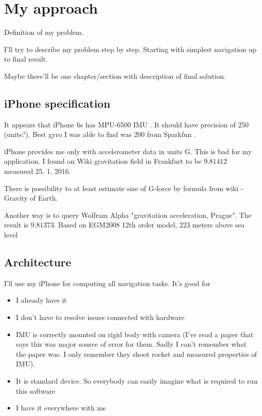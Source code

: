 \chapter{My approach}

Definition of my problem. 

I'll try to describe my problem step by step. Starting with simplest navigation up to final result.

Maybe there'll be one chapter/section with description of final solution.

\section{iPhone specification}

It appears that iPhone 6s has MPU-6500 IMU \cite{iphone-spec-chipworks}. It should have precision of 250 (units?). Best gyro I was able to find was 200 from Sparkfun \cite{sparkfun-buying-guide}.

iPhone provides me only with accelerometer data in units G. This is bad for my application. I found on Wiki gravitation field in Frankfurt to be $9.81412$ measured 25. 1. 2016.

There is possibility to at least estimate size of G-force by formula from wiki - Gravity of Earth.

Another way is to query Wolfram Alpha "gravitation acceleration, Prague". The result is $9.81373$. Based on EGM2008 12th order model, 223 meters above sea level

\section{Architecture}

I'll use my iPhone for computing all navigation tasks. It's good for
\begin{itemize}
\item I already have it
\item I don't have to resolve issues connected with hardware
\item IMU is correctly mounted on rigid body with camera (I've read a paper that says this was major source of error for them. Sadly I can't remember what the paper was. I only remember they shoot rocket and measured properties of IMU).
\item It is standard device. So everybody can easily imagine what is required to run this software
\item I have it everywhere with me
\end{itemize}

